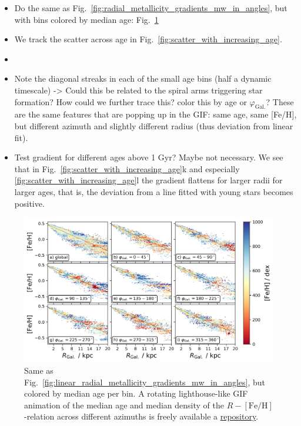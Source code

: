 \documentclass[fleqn,usenatbib]{mnras}
\begin{document}
\begin{itemize}
    \item Do the same as Fig.~\ref{fig:radial_metallicity_gradients_mw_in_angles}, but with bins colored by median age: Fig.~\ref{fig:radial_metallicity_gradients_mw_in_angles_age}
    \item We track the scatter across age in Fig.~\ref{fig:scatter_with_increasing_age}.
    \item 
    \item Note the diagonal streaks in each of the small age bins (half a dynamic timescale) -> Could this be related to the spiral arms triggering star formation? How could we further trace this? color this by age or $\varphi_\mathrm{Gal.}$? These are the same features that are popping up in the GIF: same age, same [Fe/H], but different azimuth and slightly different radius (thus deviation from linear fit).
    \item Test gradient for different ages above 1 Gyr? Maybe not necessary. We see that in Fig.~\ref{fig:scatter_with_increasing_age}k and especially \ref{fig:scatter_with_increasing_age}l the gradient flattens for larger radii for larger ages, that is, the deviation from a line fitted with young stars becomes positive.
\end{itemize}

\begin{figure}
    \centering
    \includegraphics[width=\columnwidth]{figures/radial_metallicity_gradients_mw_in_angles_age.png}
    \caption{Same as Fig.~\ref{fig:linear_radial_metallicity_gradients_mw_in_angles}, but colored by median age per bin. A rotating lighthouse-like GIF animation of the median age and median density of the $R-\mathrm{[Fe/H]}$-relation across different azimuths is freely available a \href{https://github.com/svenbuder/nihao_radial_metallicity_gradients/blob/main/figures/xyz_rfeh.gif}{repository}.}
    \label{fig:radial_metallicity_gradients_mw_in_angles_age}
\end{figure}
\end{document}

